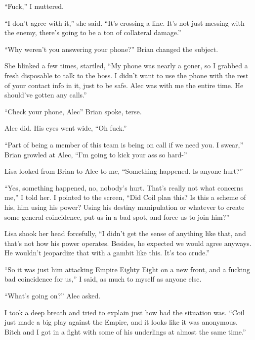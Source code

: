 ``Fuck,'' I muttered.



``I don't agree with it,'' she said.  ``It's crossing a line.  It's not just messing with the enemy, there's going to be a ton of collateral damage.''



``Why weren't you answering your phone?'' Brian changed the subject.



She blinked a few times, startled, ``My phone was nearly a goner, so I grabbed a fresh disposable to talk to the boss.  I didn't want to use the phone with the rest of your contact info in it, just to be safe.  Alec was with me the entire time.  He should've gotten any calls.''



``Check your phone, Alec'' Brian spoke, terse.



Alec did.  His eyes went wide, ``Oh fuck.''



``Part of being a member of this team is being on call if we need you.  I swear,'' Brian growled at Alec, ``I'm going to kick your ass so hard-''



Lisa looked from Brian to Alec to me, ``Something happened.  Is anyone hurt?''



``Yes, something happened, no, nobody's hurt.  That's really not what concerns me,'' I told her.  I pointed to the screen, ``Did Coil plan this?  Is this a scheme of his, him using his power?  Using his destiny manipulation or whatever to create some general coincidence, put us in a bad spot, and force us to join him?''



Lisa shook her head forcefully, ``I didn't get the sense of anything like that, and that's not how his power operates.  Besides, he expected we would agree anyways.  He wouldn't jeopardize that with a gambit like this.  It's too crude.''



``So it was just him attacking Empire Eighty Eight on a new front, and a fucking bad coincidence for us,'' I said, as much to myself as anyone else.



``What's going on?'' Alec asked.



I took a deep breath and tried to explain just how bad the situation was.  ``Coil just made a big play against the Empire, and it looks like it was anonymous.  Bitch and I got in a fight with some of his underlings at almost the same time.''



